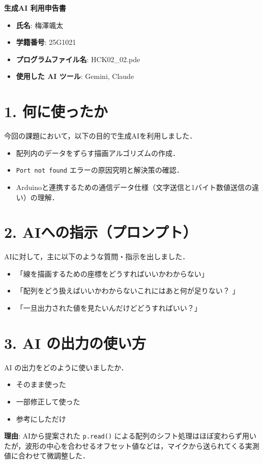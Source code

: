 \documentclass[a4paper,11pt]{jsarticle}
\begin{document}
{\Large \textbf{生成AI 利用申告書}}

\vspace{1em}

\begin{itemize}
    \item \textbf{氏名}: 梅澤颯太
    \item \textbf{学籍番号}: 25G1021
    \item \textbf{プログラムファイル名}: HCK02\_02.pde
    \item \textbf{使用した AI ツール}: Gemini, Claude
\end{itemize}

\section*{1. 何に使ったか}
今回の課題において，以下の目的で生成AIを利用しました．
\begin{itemize}
    \item 配列内のデータをずらす描画アルゴリズムの作成．
    \item \texttt{Port not found} エラーの原因究明と解決策の確認．
    \item Arduinoと連携するための通信データ仕様（文字送信と1バイト数値送信の違い）の理解．
\end{itemize}

\section*{2. AIへの指示（プロンプト）}
AIに対して，主に以下のような質問・指示を出しました．
\begin{itemize}
    \item 「線を描画するための座標をどうすればいいかわからない」
    \item 「配列をどう扱えばいいかわからないこれにはあと何が足りない？ 」
    \item 「一旦出力された値を見たいんだけどどうすればいい？」
\end{itemize}

\section*{3. AI の出力の使い方}
AI の出力をどのように使いましたか．
\begin{itemize}
    \item[$\square$] そのまま使った
    \item[$\boxtimes$] 一部修正して使った
    \item[$\square$] 参考にしただけ
\end{itemize}
\textbf{理由}:
AIから提案された \texttt{p.read()} による配列のシフト処理はほぼ変わらず用いたが，波形の中心を合わせるオフセット値などは，マイクから送られてくる実測値に合わせて微調整した．
\end{document}

